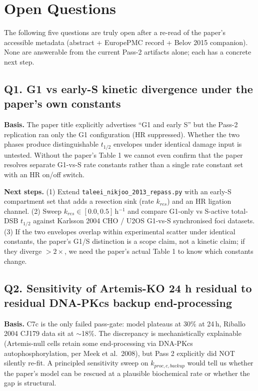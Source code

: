 \section{Open Questions}

The following five questions are truly open after a re-read of the paper's accessible metadata (abstract + EuropePMC record + Belov 2015 companion). None are answerable from the current Pass-2 artifacts alone; each has a concrete next step.

\subsection*{Q1. G1 vs early-S kinetic divergence under the paper's own constants}
\textbf{Basis.} The paper title explicitly advertises ``G1 and early S'' but the Pass-2 replication ran only the G1 configuration (HR suppressed). Whether the two phases produce distinguishable $t_{1/2}$ envelopes under identical damage input is untested. Without the paper's Table 1 we cannot even confirm that the paper resolves separate G1-vs-S rate constants rather than a single rate constant set with an HR on/off switch.

\textbf{Next steps.} (1) Extend \texttt{taleei\_nikjoo\_2013\_repass.py} with an early-S compartment set that adds a resection sink (rate $k_{res}$) and an HR ligation channel. (2) Sweep $k_{res}\in[0.0,0.5]$\,h$^{-1}$ and compare G1-only vs S-active total-DSB $t_{1/2}$ against Karlsson 2004 CHO / U2OS G1-vs-S synchronised foci datasets. (3) If the two envelopes overlap within experimental scatter under identical constants, the paper's G1/S distinction is a scope claim, not a kinetic claim; if they diverge $>2\times$, we need the paper's actual Table 1 to know which constants change.

\subsection*{Q2. Sensitivity of Artemis-KO 24 h residual to residual DNA-PKcs backup end-processing}
\textbf{Basis.} C7c is the only failed pass-gate: model plateaus at 30\% at 24\,h, Riballo 2004 CJ179 data sit at $\sim$18\%. The discrepancy is mechanistically explainable (Artemis-null cells retain some end-processing via DNA-PKcs autophosphorylation, per Meek et al.\ 2008), but Pass 2 explicitly did NOT silently re-fit. A principled sensitivity sweep on $k_{proc,c,backup}$ would tell us whether the paper's model can be rescued at a plausible biochemical rate or whether the gap is structural.

